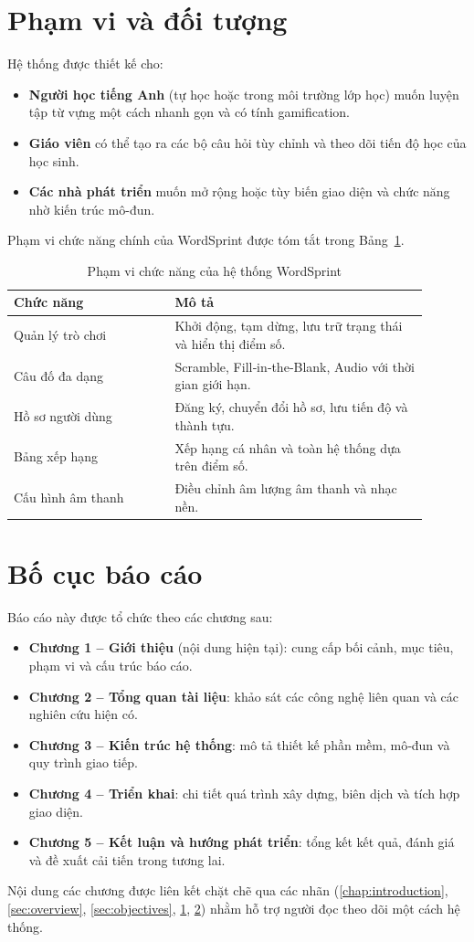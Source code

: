 \section{Phạm vi và đối tượng}
\label{sec:scope}
Hệ thống được thiết kế cho:
\begin{itemize}
    \item \textbf{Người học tiếng Anh} (tự học hoặc trong môi trường lớp học) muốn luyện tập từ vựng một cách nhanh gọn và có tính gamification.
    \item \textbf{Giáo viên} có thể tạo ra các bộ câu hỏi tùy chỉnh và theo dõi tiến độ học của học sinh.
    \item \textbf{Các nhà phát triển} muốn mở rộng hoặc tùy biến giao diện và chức năng nhờ kiến trúc mô-đun.
\end{itemize}

Phạm vi chức năng chính của WordSprint được tóm tắt trong Bảng~\ref{tab:functional_scope}.

\begin{table}[h!]
\centering
\caption{Phạm vi chức năng của hệ thống WordSprint}
\label{tab:functional_scope}
\begin{tabular}{p{0.35\linewidth}p{0.55\linewidth}}
\toprule
Chức năng & Mô tả \\
\midrule
Quản lý trò chơi & Khởi động, tạm dừng, lưu trữ trạng thái và hiển thị điểm số. \\
Câu đố đa dạng & Scramble, Fill‑in‑the‑Blank, Audio với thời gian giới hạn. \\
Hồ sơ người dùng & Đăng ký, chuyển đổi hồ sơ, lưu tiến độ và thành tựu. \\
Bảng xếp hạng & Xếp hạng cá nhân và toàn hệ thống dựa trên điểm số. \\
Cấu hình âm thanh & Điều chỉnh âm lượng âm thanh và nhạc nền. \\
\bottomrule
\end{tabular}
\end{table}

\section{Bố cục báo cáo}
\label{sec:structure}
Báo cáo này được tổ chức theo các chương sau:
\begin{itemize}
    \item \textbf{Chương 1 -- Giới thiệu} (nội dung hiện tại): cung cấp bối cảnh, mục tiêu, phạm vi và cấu trúc báo cáo.
    \item \textbf{Chương 2 -- Tổng quan tài liệu}: khảo sát các công nghệ liên quan và các nghiên cứu hiện có.
    \item \textbf{Chương 3 -- Kiến trúc hệ thống}: mô tả thiết kế phần mềm, mô‑đun và quy trình giao tiếp.
    \item \textbf{Chương 4 -- Triển khai}: chi tiết quá trình xây dựng, biên dịch và tích hợp giao diện.
    \item \textbf{Chương 5 -- Kết luận và hướng phát triển}: tổng kết kết quả, đánh giá và đề xuất cải tiến trong tương lai.
\end{itemize}

\noindent Nội dung các chương được liên kết chặt chẽ qua các nhãn (\ref{chap:introduction}, \ref{sec:overview}, \ref{sec:objectives}, \ref{sec:scope}, \ref{sec:structure}) nhằm hỗ trợ người đọc theo dõi một cách hệ thống.

